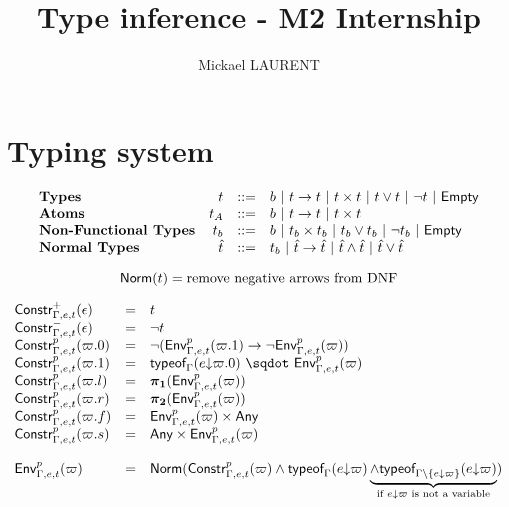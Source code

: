 \documentclass[a4paper]{article}
\title{\vspace{1.5cm}Type inference - M2 Internship}
\author{Mickael LAURENT}
\date{\vspace{-5ex}}
\theoremstyle{definition}
\begin{document}
    \maketitle

    \section{Typing system}

    \[
      \begin{array}{lrcl}
      \textbf{Types} & t & ::= & b~|~ t\to t~|~ t\times t~|~ t\vee t ~|~ \neg t ~|~ \textsf{Empty}\\
      \textbf{Atoms} & t_A & ::= & b~|~ t\to t~|~ t\times t\\
      \textbf{Non-Functional Types} & t_b & ::= & b ~|~ t_b\times t_b ~|~ t_b\vee t_b ~|~ \neg t_b ~|~ \textsf{Empty}\\
      \textbf{Normal Types} & \hat t & ::= & t_b ~|~ \hat t\to \hat t~|~ \hat t \wedge \hat t ~|~ \hat t\vee \hat t
      \end{array}
    \]

    \[
      \textsf{Norm}(t) = \text{remove negative arrows from DNF}
    \]

    \[
    \begin{array}{lcl}
      \typep+\epsilon{\Gamma,e,t} & = & t\\
      \typep-\epsilon{\Gamma,e,t} & = & \neg t\\
      \typep{p}{\varpi.0}{\Gamma,e,t} & = & \neg(\arrow{\Gp p{\Gamma,e,t}{(\varpi.1)}}{\neg \Gp p {\Gamma,e,t} (\varpi)})\\
      \typep{p}{\varpi.1}{\Gamma,e,t} & = & \worra{\tyof{\occ e{\varpi.0}}\Gamma}{\Gp p {\Gamma,e,t} (\varpi)}\\
      \typep{p}{\varpi.l}{\Gamma,e,t} & = & \bpl{\Gp p {\Gamma,e,t} (\varpi)}\\
      \typep{p}{\varpi.r}{\Gamma,e,t} & = & \bpr{\Gp p {\Gamma,e,t} (\varpi)}\\
      \typep{p}{\varpi.f}{\Gamma,e,t} & = & \pair{\Gp p {\Gamma,e,t} (\varpi)}\Any\\
      \typep{p}{\varpi.s}{\Gamma,e,t} & = & \pair\Any{\Gp p {\Gamma,e,t} (\varpi)}\\ \\
      \Gp p {\Gamma,e,t} (\varpi) & = & \norm {\typep p \varpi {\Gamma,e,t} \land \tyof {\occ e \varpi} \Gamma
      \underbrace{\land \tyof {\occ e \varpi} {\Gamma\setminus\{\occ e \varpi\}}}_\text{if $\occ e \varpi$ is not a variable}}\\
    \end{array}
    \]
\end{document}
